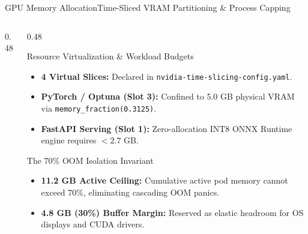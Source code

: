 \begin{frame}{GPU Memory Allocation}{Time-Sliced VRAM Partitioning \& Process Capping}
\begin{columns}[T]
\begin{column}{0.48\textwidth}
{
            }
        \end{column}
        \begin{column}{0.48\textwidth}
            \begin{block}{Resource Virtualization \& Workload Budgets}
                \begin{itemize}\scriptsize
                    \item \textbf{4 Virtual Slices:} Declared in \texttt{nvidia-time-slicing-config.yaml}.
                    \item \textbf{PyTorch / Optuna (Slot 3):} Confined to 5.0 GB physical VRAM via \texttt{memory\_fraction(0.3125)}.
                    \item \textbf{FastAPI Serving (Slot 1):} Zero-allocation INT8 ONNX Runtime engine requires $< 2.7\text{ GB}$.
                \end{itemize}
            \end{block}
            \vspace{0.02cm}
            \begin{block}{The 70\% OOM Isolation Invariant}
                \begin{itemize}\scriptsize
                    \item \textbf{11.2 GB Active Ceiling:} Cumulative active pod memory cannot exceed 70\%, eliminating cascading OOM panics.
                    \item \textbf{4.8 GB (30\%) Buffer Margin:} Reserved as elastic headroom for OS displays and CUDA drivers.
                \end{itemize}
            \end{block}
        \end{column}
    \end{columns}


\end{frame}
